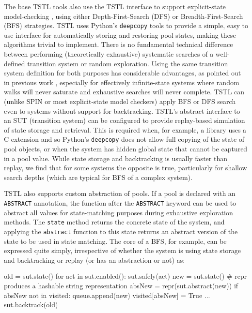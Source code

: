 The base TSTL tools also use the TSTL interface to support explicit-state model-checking \cite{ModelChecking,SPIN}, using either Depth-First-Search (DFS) or Breadth-First-Search (BFS) strategies.  TSTL uses Python's {\tt deepcopy} tools to provide a simple, easy to use interface for automatically storing and restoring pool states, making these algorithms trivial to implement.  There is no fundamental technical difference between performing (theoretically exhaustive) systematic searches of a well-defined transition system or random exploration.  Using the same transition system definition for both purposes has considerable advantages, as pointed out in previous work \cite{woda08}, especially for effectively infinite-state systems where random walks will never saturate and exhaustive searches will never complete.
TSTL can (unlike SPIN or most explicit-state model checkers) apply BFS or DFS search even to systems without support for backtracking.  TSTL's abstract interface to an SUT (transition system) can be configured to provide replay-based simulation of state storage and retrieval.  This is required when, for example, a library uses a C extension and so Python's {\tt deepcopy} does not allow full copying of the state of pool objects, or when the system has hidden global state that cannot be captured in a pool value.  While state storage and backtracking is usually faster than replay, we find that for some systems the opposite is true, particularly for shallow search depths (which are typical for BFS of a complex system).

TSTL also supports custom abstraction of pools.  If a pool is declared with an {\tt ABSTRACT} annotation, the function after the {\tt ABSTRACT} keyword can be used to abstract all values for state-matching purposes during exhaustive exploration methods.  The {\tt state} method returns the concrete state of the system, and applying the {\tt abstract} function to this state returns an abstract version of the state to be used in state matching.  The core of a BFS, for example, can be expressed quite simply, irrespective of whether the system is using state storage and backtracking or replay (or has an abstraction or not) as:

{\scriptsize 
\begin{code}
old = sut.state()
for act in sut.enabled():
   sut.safely(act)
   new = sut.state()
   \# repr produces a hashable string representation
   absNew = repr(sut.abstract(new))
   if absNew not in visited:
      queue.append(new)
      visited[absNew] = True
      ...
   sut.backtrack(old)
\end{code}
}

